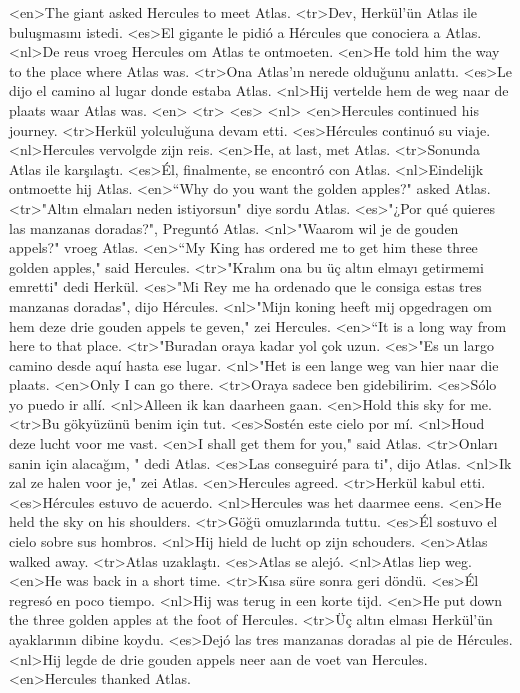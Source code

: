 <en>The giant asked Hercules to meet Atlas.
<tr>Dev, Herkül'ün Atlas ile buluşmasını istedi.
<es>El gigante le pidió a Hércules que conociera a Atlas.
<nl>De reus vroeg Hercules om Atlas te ontmoeten.
<en>He told him the way to the place where Atlas was.
<tr>Ona Atlas'ın nerede olduğunu anlattı.
<es>Le dijo el camino al lugar donde estaba Atlas.
<nl>Hij vertelde hem de weg naar de plaats waar Atlas was.
<en>
<tr>
<es>
<nl>
<en>Hercules continued his journey.
<tr>Herkül yolculuğuna devam etti.
<es>Hércules continuó su viaje.
<nl>Hercules vervolgde zijn reis.
<en>He, at last, met Atlas.
<tr>Sonunda Atlas ile karşılaştı.
<es>Él, finalmente, se encontró con Atlas.
<nl>Eindelijk ontmoette hij Atlas.
<en>“Why do you want the golden apples?" asked Atlas.
<tr>"Altın elmaları neden istiyorsun" diye sordu Atlas.
<es>"¿Por qué quieres las manzanas doradas?", Preguntó Atlas.
<nl>"Waarom wil je de gouden appels?" vroeg Atlas.
<en>“My King has ordered me to get him these three golden apples," said Hercules.
<tr>"Kralım ona bu üç altın elmayı getirmemi emretti" dedi Herkül.
<es>"Mi Rey me ha ordenado que le consiga estas tres manzanas doradas", dijo Hércules.
<nl>"Mijn koning heeft mij opgedragen om hem deze drie gouden appels te geven," zei Hercules.
<en>“It is a long way from here to that place.
<tr>"Buradan oraya kadar yol çok uzun.
<es>"Es un largo camino desde aquí hasta ese lugar.
<nl>"Het is een lange weg van hier naar die plaats.
<en>Only I can go there.
<tr>Oraya sadece ben gidebilirim.
<es>Sólo yo puedo ir allí.
<nl>Alleen ik kan daarheen gaan.
<en>Hold this sky for me.
<tr>Bu gökyüzünü benim için tut.
<es>Sostén este cielo por mí.
<nl>Houd deze lucht voor me vast.
<en>I shall get them for you," said Atlas.
<tr>Onları sanin için alacağım, " dedi Atlas.
<es>Las conseguiré para ti", dijo Atlas.
<nl>Ik zal ze halen voor je," zei Atlas.
<en>Hercules agreed.
<tr>Herkül kabul etti.
<es>Hércules estuvo de acuerdo.
<nl>Hercules was het daarmee eens.
<en>He held the sky on his shoulders.
<tr>Göğü omuzlarında tuttu.
<es>Él sostuvo el cielo sobre sus hombros.
<nl>Hij hield de lucht op zijn schouders.
<en>Atlas walked away.
<tr>Atlas uzaklaştı.
<es>Atlas se alejó.
<nl>Atlas liep weg.
<en>He was back in a short time.
<tr>Kısa süre sonra geri döndü.
<es>Él regresó en poco tiempo.
<nl>Hij was terug in een korte tijd.
<en>He put down the three golden apples at the foot of Hercules.
<tr>Üç altın elması Herkül'ün ayaklarının dibine koydu.
<es>Dejó las tres manzanas doradas al pie de Hércules.
<nl>Hij legde de drie gouden appels neer aan de voet van Hercules.
<en>Hercules thanked Atlas.
